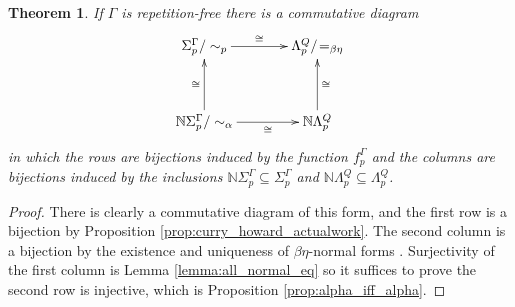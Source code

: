 \documentclass[english,letter paper,12pt,leqno]{article}
\newtheorem{theorem}{Theorem}[section]
\theoremstyle{example}
\numberwithin{equation}{section}
\def\be{\begin{equation}}
\def\ee{\end{equation}}
\begin{document}
\begin{theorem}\label{theorem:normal_form_prop} If $\Gamma$ is repetition-free there is a commutative diagram
\be\label{eq:most_important_map_2}
\xymatrix@C+1pc@R+1pc{
\Sigma^\Gamma_p/ \sim_p\ar^-{\cong}[r] & \Lambda^Q_p/ \! =_{\beta \eta}\\
\mathbb{N}\Sigma^\Gamma_p / \sim_\alpha \ar[u]^-{\cong}\ar_-{\cong}[r] & \mathbb{N}\Lambda^Q_p \ar_-{\cong}[u]
}
\ee
in which the rows are bijections induced by the function $f^\Gamma_p$ and the columns are bijections induced by the inclusions $\mathbb{N} \Sigma^\Gamma_p \subseteq \Sigma^\Gamma_p$ and $\mathbb{N} \Lambda^Q_p \subseteq \Lambda^Q_p$.
\end{theorem}
\begin{proof}
There is clearly a commutative diagram of this form, and the first row is a bijection by Proposition \ref{prop:curry_howard_actualwork}. The second column is a bijection by the existence and uniqueness of $\beta\eta$-normal forms \cite[Corollary 4.3]{selinger}. Surjectivity of the first column is Lemma \ref{lemma:all_normal_eq} so it suffices to prove the second row is injective, which is Proposition \ref{prop:alpha_iff_alpha}.
\end{proof}
\end{document}
